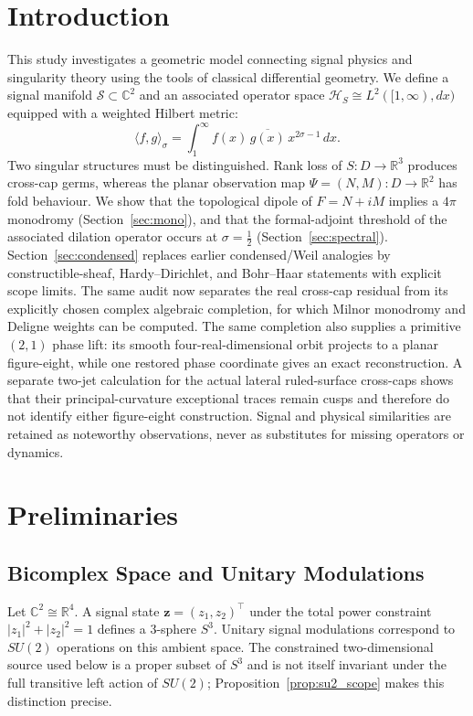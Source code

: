 \documentclass[11pt]{article}
\begin{document}
\section{Introduction}
This study investigates a geometric model connecting signal physics and
singularity theory using the tools of classical differential geometry.
We define a signal manifold $\mathcal{S} \subset \mathbb{C}^2$ and an associated
operator space $\mathcal{H}_S \cong L^2([1, \infty), dx)$ equipped with a
weighted Hilbert metric:
\[
  \langle f, g \rangle_{\sigma}
  = \int_1^\infty f(x)\,\overline{g(x)}\,x^{2\sigma-1}\,dx.
\]
Two singular structures must be distinguished.  Rank loss of
$S:D\to\mathbb R^3$ produces cross-cap germs, whereas the planar observation
map $\Psi=(N,M):D\to\mathbb R^2$ has fold behaviour.  We show that the
topological dipole of $F=N+iM$ implies a $4\pi$ monodromy
(Section~\ref{sec:mono}), and that the formal-adjoint threshold of the associated
dilation operator occurs at $\sigma = \tfrac12$ (Section~\ref{sec:spectral}).
Section~\ref{sec:condensed} replaces earlier condensed/Weil analogies by
constructible-sheaf, Hardy--Dirichlet, and Bohr--Haar statements with explicit
scope limits.  The same audit now separates the real cross-cap residual from
its explicitly chosen complex algebraic completion, for which Milnor
monodromy and Deligne weights can be computed.  The same completion also
supplies a primitive $(2,1)$ phase lift: its smooth four-real-dimensional orbit
projects to a planar figure-eight, while one restored phase coordinate gives an
exact reconstruction.  A separate two-jet calculation for the actual lateral
ruled-surface cross-caps shows that their principal-curvature exceptional
traces remain cusps and therefore do not identify either figure-eight
construction.  Signal and physical
similarities are retained as noteworthy
observations, never as substitutes for missing operators or dynamics.

\section{Preliminaries}
\subsection{Bicomplex Space and Unitary Modulations}
Let $\mathbb{C}^2 \cong \mathbb{R}^4$.  A signal state
$\mathbf{z} = (z_1, z_2)^\top$ under the total power constraint
$|z_1|^2 + |z_2|^2 = 1$ defines a 3-sphere $S^3$.  Unitary signal modulations
correspond to $SU(2)$ operations on this ambient space.  The constrained
two-dimensional source used below is a proper subset of $S^3$ and is not itself
invariant under the full transitive left action of $SU(2)$;
Proposition~\ref{prop:su2_scope} makes this distinction precise.
\end{document}
